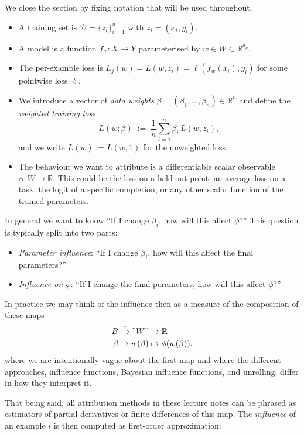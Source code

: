 \documentclass[11pt]{article}
\begin{document}
We close the section by fixing notation that will be used throughout.
\begin{itemize}
\item A training set is $\mathcal{D} = \{z_i\}_{i=1}^n$ with $z_i = (x_i, y_i)$.
\item A model is a function $f_w: X \to Y$ parameterised by $w \in W \subset \mathbb{R}^{d_p}$.
\item The per-example loss is $L_j(w)=L(w, z_i) = \ell(f_w(x_i), y_i)$ for some pointwise loss $\ell$. 
\item We introduce a vector of \emph{data weights} $\beta = (\beta_1, \ldots, \beta_n) \in \mathbb{R}^n$ and define the \emph{weighted training loss}
\[
  L(w; \beta) \;:=\; \frac{1}{n}\sum_{i=1}^n \beta_i\, L(w, z_i),
\]
and we write $L(w) := L(w, 1)$ for the unweighted loss.
\item The behaviour we want to attribute is a differentiable scalar observable $\phi: W \to \mathbb{R}$. This could be the loss on a held-out point, an average loss on a task, the logit of a specific completion, or any other scalar function of the trained parameters.  
\end{itemize}  

In general we want to know ``If I change $\beta_i$, how will this affect $\phi$?'' This question is typically split into two parts:
\begin{itemize}
  \item \emph{Parameter influence}: ``If I change $\beta_i$, how will this affect the final parameters?''
  \item \emph{Influence on $\phi$}: ``If I change the final parameters, how will this affect $\phi$?''
\end{itemize}
In practice we may think of the influence then as a measure of the composition of these maps
\begin{align}\label{eq:holy-maps}
  B &\xrightarrow{\pi} "W"\to \mathbb{R} \\
  \beta &\mapsto w(\beta) \mapsto \phi(w(\beta)).
\end{align}
where we are intentionally vague about the first map and where the different approaches, influence functions, Bayesian influence functions, and unrolling, differ in how they interpret it.

That being said, all attribution methods in these lecture notes can be phrased as estimators of partial derivatives or finite differences of this map. The \emph{influence} of an example $i$ is then computed as first-order approximation:
\end{document}
